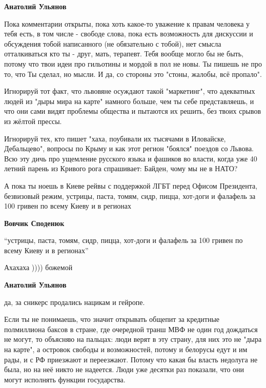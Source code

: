 \begin{itemize}
\begin{itemize}
\textbf{Анатолий Ульянов} 

Пока комментарии открыты, пока хоть какое-то уважение к правам человека у тебя
есть, в том числе - свободе слова, пока есть возможность для дискуссии и
обсуждения тобой написанного (не обязательно с тобой), нет смысла отталкиваться
кто ты - друг, мать, терапевт. Тебя вообще могло бы не быть, потому что твои
идеи про гильотины и мордой в пол не новы. Ты пишешь не про то, что Ты сделал,
но мысли. И да, со стороны это "стоны, жалобы, всё пропало".

Игнорируй тот факт, что львовяне осуждают такой "маркетинг", что адекватных
людей из "дыры мира на карте" намного больше, чем ты себе представляешь, и что
они сами видят проблемы общества и пытаются их решить, без твоих срывов из
жёлтой прессы.

Игнорируй тех, кто пишет "хаха, поубивали их тысячами в Иловайске, Дебальцево",
вопросы по Крыму и как этот регион "боялся" поездов со Львова. Всю эту дичь про
ущемление русского языка и фашиков во власти, когда уже 40 летний парень из
Кривого рога спрашивает: Байден, чому мы не в НАТО?

А пока ты ноешь в Киеве рейвы с поддержкой ЛГБТ перед Офисом Президента,
безвизовый режим, устрицы, паста, томям, сидр, пицца, хот-доги и фалафель за
100 гривен по всему Киеву и в регионах

 
\textbf{Вовчик Споденюк} 

“устрицы, паста, томям, сидр, пицца, хот-доги и фалафель за 100 гривен по всему
Киеву и в регионах”

Ахахаха )))) божемой


 
\textbf{Анатолий Ульянов} 

да, за сникерс продались нацикам и гейропе.

Если ты не понимаешь, что значит открывать общепит за кредитные полмиллиона
баксов в стране, где очередной транш МВФ не один год дождаться не могут, то
объясняю на пальцах: люди верят в эту страну, для них это не "дыра на карте", а
островок свободы и возможностей, потому и белорусы едут и им рады, и с РФ
приезжают и переезжают. Потому что какая бы власть недолуга не была, но на неё
никто не надеется. Люди уже десятки раз показали, что они могут исполнять
функции государства.


\end{itemize}
\end{itemize}
